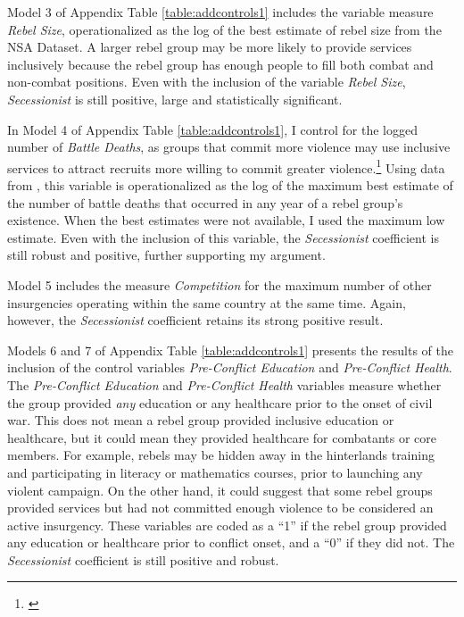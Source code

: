 \documentclass[12pt, letterpaper]{article}
\begin{document}
Model 3 of Appendix Table \ref{table:addcontrols1} includes the variable measure \textit{Rebel Size}, operationalized as the log of the best estimate of rebel size from the NSA Dataset. A larger rebel group may be more likely to provide services inclusively because the rebel group has enough people to fill both combat and non-combat positions. Even with the inclusion of the variable \textit{Rebel Size}, \textit{Secessionist} is still positive, large and statistically significant. 

In Model 4 of Appendix Table \ref{table:addcontrols1}, I control for the logged number of \textit{Battle Deaths}, as groups that commit more violence may use inclusive services to attract recruits more willing to commit greater violence.\footnote{\citealt{berman2008religion}} Using data from \citet{lacina2005monitoring}, this variable is operationalized as the log of the maximum best estimate of the number of battle deaths that occurred in any year of a rebel group's existence. When the best estimates were not available, I used the maximum low estimate. Even with the inclusion of this variable, the \textit{Secessionist} coefficient is still robust and positive, further supporting my argument. 

Model 5 includes the measure \textit{Competition} for the maximum number of other insurgencies operating within the same country at the same time. Again, however, the \textit{Secessionist} coefficient retains its strong positive result. 

Models 6 and 7 of Appendix Table \ref{table:addcontrols1} presents the results of the inclusion of the control variables \textit{Pre-Conflict Education} and \textit{Pre-Conflict Health}. The \textit{Pre-Conflict Education} and \textit{Pre-Conflict Health} variables measure whether the group provided \textit{any} education or any healthcare prior to the onset of civil war. This does not mean a rebel group provided inclusive education or healthcare, but it could mean they provided healthcare for combatants or core members. For example, rebels may be hidden away in the hinterlands training and participating in literacy or mathematics courses, prior to launching any violent campaign. On the other hand, it could suggest that some rebel groups provided services but had not committed enough violence to be considered an active insurgency. These variables are coded as a ``1'' if the rebel group provided any education or healthcare prior to conflict onset, and a ``0'' if they did not. The \textit{Secessionist} coefficient is still positive and robust. 
\end{document}

